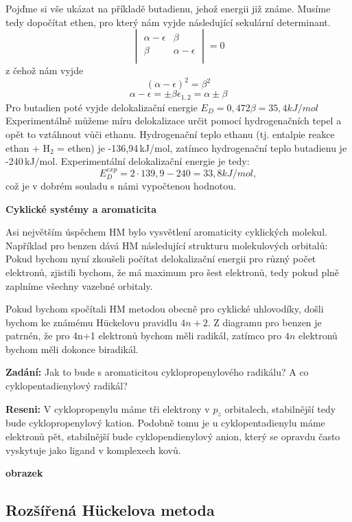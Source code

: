 Pojďme si vše ukázat na příkladě butadienu, jehož energii již známe. Musíme tedy dopočítat ethen, pro který nám vyjde následující sekulární determinant. 
\begin{equation}
\begin{vmatrix}
\alpha - \epsilon & \beta \\
\beta & \alpha - \epsilon \\
\end{vmatrix}
=0
\end{equation}
z čehož nám vyjde
$$
(\alpha-\epsilon)^2=\beta^2
$$
$$
\alpha - \epsilon = \pm \beta
\epsilon_{1,2}= \alpha\pm \beta
$$
Pro butadien poté vyjde delokalizační energie $E_D=0,472\beta=35,4 kJ/mol$
Experimentálně můžeme míru delokalizace určit pomocí hydrogenačních tepel a opět to vztáhnout vůči ethanu.
Hydrogenační teplo ethanu (tj. entalpie reakce ethan + H$_2$ = ethen) je -136,94\,kJ/mol, zatímco hydrogenační teplo butadienu je -240\,kJ/mol. Experimentální delokalizační energie je tedy:
$$
E_D^{exp}=2\cdot139,9-240 = 33,8 kJ/mol,
$$
což je v dobrém souladu s námi vypočtenou hodnotou.

\medskip
\noindent
\textbf{Cyklické systémy a aromaticita}

Asi největším úspěchem HM bylo vysvětlení aromaticity cyklických molekul.
Například pro benzen dává HM následující strukturu molekulových orbitalů:
Pokud bychom nyní zkoušeli počítat delokalizační energii pro různý počet elektronů, zjistili bychom, že má maximum pro šest elektronů, tedy pokud plně zaplníme všechny vazebné orbitaly.

Pokud bychom spočítali HM metodou obecně pro cyklické uhlovodíky, došli bychom ke známému H\"{u}ckelovu pravidlu $4n+2$. Z diagramu pro benzen je patrnén, že pro 4n+1 elektronů bychom měli radikál, zatímco pro $4n$ elektronů bychom měli dokonce biradikál.

\begin{priklad}
\textbf{Zadání:} Jak to bude s aromaticitou cyklopropenylového radikálu? A co cyklopentadienylový radikál?

\textbf{Reseni:} V cyklopropenylu máme tři elektrony v $p_z$ orbitalech, stabilnější tedy bude cyklopropenylový kation. Podobně tomu je u cyklopentadienylu máme elektronů pět, stabilnější bude cyklopendienylový anion, který se opravdu často vyskytuje jako ligand v komplexech kovů.
\end{priklad}

\textbf{obrazek}
\bigskip

\subsection{Rozšířená H\"{u}ckelova metoda}

